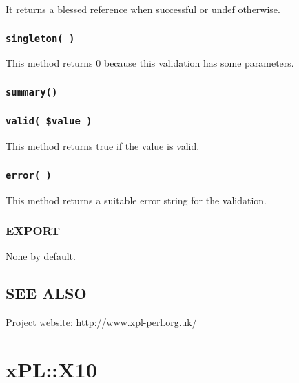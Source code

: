 It returns a blessed reference when successful or undef otherwise.

\subsubsection*{\texttt{singleton( )}\label{xPL::Validation::Set_singleton_}}


This method returns 0 because this validation has some parameters.

\subsubsection*{\texttt{summary()}\label{xPL::Validation::Set_summary_}}
\subsubsection*{\texttt{valid( \$value )}\label{xPL::Validation::Set_valid_value_}}


This method returns true if the value is valid.

\subsubsection*{\texttt{error( )}\label{xPL::Validation::Set_error_}}


This method returns a suitable error string for the validation.

\subsubsection*{EXPORT\label{xPL::Validation::Set_EXPORT}}


None by default.

\subsection*{SEE ALSO\label{xPL::Validation::Set_SEE_ALSO}}


Project website: http://www.xpl-perl.org.uk/

\section{xPL::X10\label{xPL::X10}}


